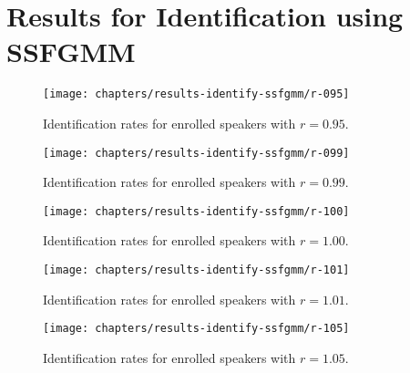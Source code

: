 \chapter{Results for Identification using SSFGMM}
\label{apx:results-identify-ssfgmm}



\begin{figure}[ht]
    \centering
    \texttt{[image: chapters/results-identify-ssfgmm/r-095]}
    \caption{Identification rates for enrolled speakers with $r = 0.95$.}
    \label{fig:r-095}
\end{figure}

\newpage


\begin{figure}[ht]
    \centering
    \texttt{[image: chapters/results-identify-ssfgmm/r-099]}
    \caption{Identification rates for enrolled speakers with $r = 0.99$.}
    \label{fig:r-099}
\end{figure}

\newpage


\begin{figure}[ht]
    \centering
    \texttt{[image: chapters/results-identify-ssfgmm/r-100]}
    \caption{Identification rates for enrolled speakers with $r = 1.00$.}
    \label{fig:r-100}
\end{figure}

\newpage


\begin{figure}[ht]
    \centering
    \texttt{[image: chapters/results-identify-ssfgmm/r-101]}
    \caption{Identification rates for enrolled speakers with $r = 1.01$.}
    \label{fig:r-101}
\end{figure}

\newpage


\begin{figure}[ht]
    \centering
    \texttt{[image: chapters/results-identify-ssfgmm/r-105]}
    \caption{Identification rates for enrolled speakers with $r = 1.05$.}
    \label{fig:r-105}
\end{figure}